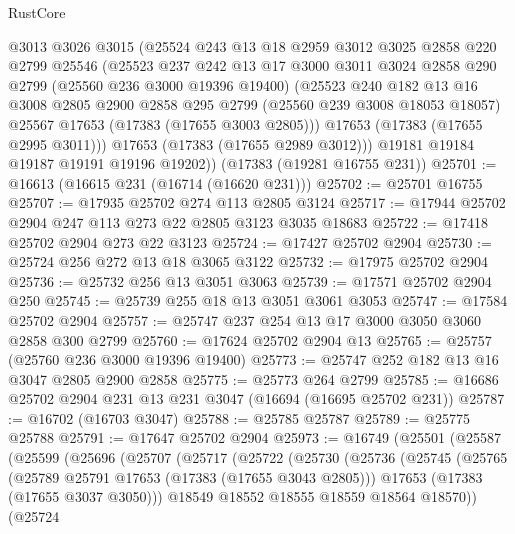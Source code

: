\begin{lexlean}{RustCore}
\begin{coremodule}
        @3013
        @3026
        @3015
        (@25524
          @243
          @13
          @18
          @2959
          @3012
          @3025
          @2858
          @220
          @2799
          @25546
          (@25523
            @237
            @242
            @13
            @17
            @3000
            @3011
            @3024
            @2858
            @290
            @2799
            (@25560 @236 @3000 @19396 @19400)
            (@25523
              @240
              @182
              @13
              @16
              @3008
              @2805
              @2900
              @2858
              @295
              @2799
              (@25560 @239 @3008 @18053 @18057)
              @25567
              @17653
              (@17383 (@17655 @3003 @2805)))
            @17653
            (@17383 (@17655 @2995 @3011)))
          @17653
          (@17383 (@17655 @2989 @3012)))
        @19181
        @19184
        @19187
        @19191
        @19196
        @19202))
    (@17383 (@19281 @16755 @231))
@25701 := @16613 (@16615 @231 (@16714 (@16620 @231)))
@25702 := @25701 @16755
@25707 := @17935 @25702 @274 @113 @2805 @3124
@25717 := @17944 @25702 @2904 @247 @113 @273 @22 @2805 @3123 @3035 @18683
@25722 := @17418 @25702 @2904 @273 @22 @3123
@25724 := @17427 @25702 @2904
@25730 := @25724 @256 @272 @13 @18 @3065 @3122
@25732 := @17975 @25702 @2904
@25736 := @25732 @256 @13 @3051 @3063
@25739 := @17571 @25702 @2904 @250
@25745 := @25739 @255 @18 @13 @3051 @3061 @3053
@25747 := @17584 @25702 @2904
@25757 := @25747 @237 @254 @13 @17 @3000 @3050 @3060 @2858 @300 @2799
@25760 := @17624 @25702 @2904 @13
@25765 := @25757 (@25760 @236 @3000 @19396 @19400)
@25773 := @25747 @252 @182 @13 @16 @3047 @2805 @2900 @2858
@25775 := @25773 @264 @2799
@25785 := @16686 @25702 @2904 @231 @13 @231 @3047 (@16694 (@16695 @25702 @231))
@25787 := @16702 (@16703 @3047)
@25788 := @25785 @25787
@25789 := @25775 @25788
@25791 := @17647 @25702 @2904
@25973 := @16749
    (@25501
      (@25587
        (@25599
          (@25696
            (@25707
              (@25717
                (@25722
                  (@25730
                    (@25736
                      (@25745
                        (@25765
                          (@25789 @25791 @17653 (@17383 (@17655 @3043 @2805)))
                          @17653
                          (@17383 (@17655 @3037 @3050)))
                        @18549
                        @18552
                        @18555
                        @18559
                        @18564
                        @18570))
                    (@25724

\end{coremodule}
\end{lexlean}
